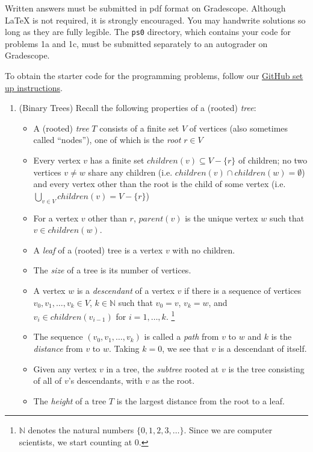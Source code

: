 \documentclass[11pt]{article}
\begin{document}
Written answers must be submitted in pdf format on Gradescope. Although \LaTeX{} is not required, it is strongly encouraged. You may handwrite solutions so long as they are fully legible. The \texttt{ps0} directory, which contains your code for problems 1a and 1c, must be submitted separately to an autograder on Gradescope. 

To obtain the starter code for the programming problems, follow our \href{https://harvard-cs-1200.github.io/cs1200/fall2025/2025_github.pdf}{GitHub set up instructions}.

 \newcommand{\children}{\mathit{children}}
 \newcommand{\parent}{\mathit{parent}}
 
\begin{enumerate}
\item (Binary Trees) 
\iffalse 
Recall the following properties of a (rooted) {\em tree}:
    \begin{itemize}
        \item A (rooted) {\em tree} $T$ consists of a finite set $V$ of vertices (also sometimes called ``nodes''), one of which is the {\em root} $r\in V$
        \item Every vertex $v$ has a finite set $\children(v)\subseteq V-\{r\}$ of children; no two vertices $v\neq w$ share any children (i.e. $\children(v)\cap \children(w) = \emptyset$) and every vertex other than the root is the child of some vertex (i.e. $\bigcup_{v\in V} \children(v) = V-\{r\}$)
        \item For a vertex $v$ other than $r$, $\parent(v)$ is the unique vertex $w$ such that $v\in \children(w)$.
        \item A {\em leaf} of a (rooted) tree is a vertex $v$ with no children.
        \item  The {\em size} of a tree is its number of vertices.
        \item A vertex $w$ is a {\em descendant} of a vertex $v$ if there is a sequence of vertices $v_0,v_1,\ldots,v_k\in V$, $k\in \mathbb{N}$ such that $v_0=v$, $v_k=w$, and $v_i\in \children(v_{i-1})$ for $i=1,\ldots,k$.
        \footnote{$\mathbb{N}$ denotes the natural numbers $\{0,1,2,3,\ldots\}$.  Since we are computer scientists, we start counting at 0.}
        \item The sequence $(v_0,v_1,\ldots,v_k)$ is called a {\em path} from $v$ to $w$ and $k$ is the {\em distance} from $v$ to $w$.
 Taking $k=0$, we see that $v$ is a descendant of itself.
        \item Given any vertex $v$ in a tree, the {\em subtree} rooted at $v$ is the tree consisting of all of $v$'s descendants, with $v$ as the root.
        \item The {\em height} of a tree $T$ is the largest distance from the root to a leaf.
    \end{itemize}
    

\end{enumerate}
\end{document}
